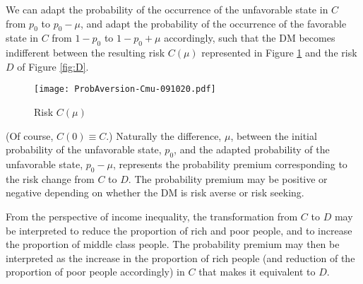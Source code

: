 \documentclass[11pt]{article}
\begin{document}
We can adapt the probability of the occurrence of the unfavorable state in $C$
from $p_{0}$ to $p_{0}-\mu$,
and adapt the probability of the occurrence of the favorable state in $C$
from $1-p_{0}$ to $1-p_{0}+\mu$ accordingly,
such that the DM becomes indifferent between the resulting risk $C(\mu)$ represented in Figure \ref{fig:Cmu}
and the risk $D$ of Figure \ref{fig:D}.
\vskip -0.5cm
\begin{figure}[H]
\begin{center}
\caption{Risk $C(\mu)$
}
\vskip 0.4cm
\texttt{[image: ProbAversion-Cmu-091020.pdf]}
\label{fig:Cmu}
\end{center}
\end{figure}
\noindent (Of course, $C(0)\equiv C$.)
Naturally the difference, $\mu$, between the initial probability of the unfavorable state, $p_{0}$,
and the adapted probability of the unfavorable state, $p_{0}-\mu$,
represents the probability premium
corresponding to the risk change from $C$ to $D$.
The probability premium may be positive or negative
depending on whether the DM is risk averse or risk seeking.

From the perspective of income inequality, the transformation from $C$ to $D$ may be interpreted to reduce the proportion of rich and poor people,
and to increase the proportion of middle class people.
The probability premium may then be interpreted as the increase in the proportion of rich people
(and reduction of the proportion of poor people accordingly) in $C$ that makes it equivalent to $D$.
\end{document}
